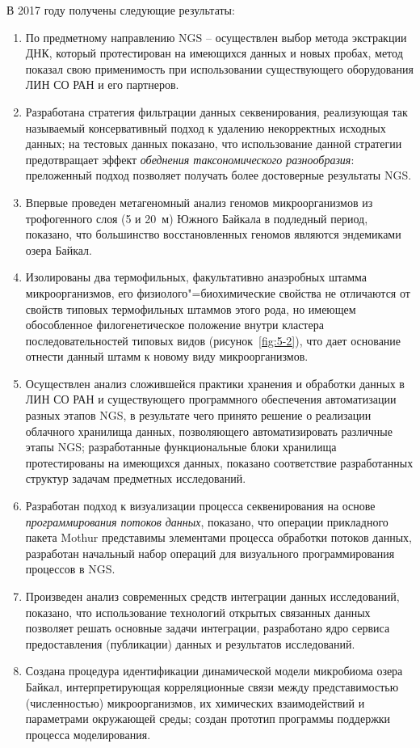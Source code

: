 \documentclass[a4paper,12pt,openany,final]{extreport}
\newcommand\theyear{2017}
\begin{document}
В \theyear{} году получены следующие результаты:
\begin{enumerate}
\item По предметному направлению NGS -- осуществлен выбор метода экстракции ДНК, который протестирован на имеющихся данных и новых пробах, метод показал свою применимость при использовании существующего оборудования ЛИН СО РАН и его партнеров.
\item Разработана стратегия фильтрации данных секвенирования, реализующая так называемый консервативный подход к удалению некорректных исходных данных; на тестовых данных показано, что использование данной стратегии предотвращает эффект \textit{обеднения таксономического разнообразия}: преложенный подход позволяет получать более достоверные результаты NGS.
\item Впервые проведен метагеномный анализ геномов микроорганизмов из трофогенного слоя (5 и 20~м) Южного Байкала в подледный период, показано, что большинство восстановленных геномов являются эндемиками озера Байкал.
\item Изолированы два термофильных, факультативно анаэробных штамма микроорганизмов, его физиолого"=биохимические свойства не отличаются от свойств типовых термофильных штаммов этого рода, но имеющем обособленное филогенетическое положение внутри кластера последовательностей типовых видов (рисунок~\ref{fig:5-2}), что дает основание отнести данный штамм к новому виду микроорганизмов.
\item Осуществлен анализ сложившейся практики хранения и обработки данных в ЛИН СО РАН и существующего программного обеспечения автоматизации разных этапов NGS, в результате чего принято решение о реализации облачного хранилища данных, позволяющего автоматизировать различные этапы NGS; разработанные функциональные блоки хранилища протестированы на имеющихся данных, показано соответствие разработанных структур задачам предметных исследований.
\item Разработан подход к визуализации процесса секвенирования на основе \emph{программирования потоков данных}, показано, что операции прикладного пакета Mothur представимы элементами процесса обработки потоков данных, разработан начальный набор операций для визуального программирования процессов в NGS.
\item Произведен анализ современных средств интеграции данных исследований, показано, что использование технологий открытых связанных данных позволяет решать  основные задачи интеграции, разработано ядро сервиса предоставления (публикации) данных и результатов исследований.
\item Создана процедура идентификации динамической модели микробиома озера Байкал, интерпретирующая корреляционные связи между представимостью (численностью) микроорганизмов, их химических взаимодействий и параметрами окружающей среды; создан прототип программы поддержки процесса моделирования.
\end{enumerate}
\end{document}
